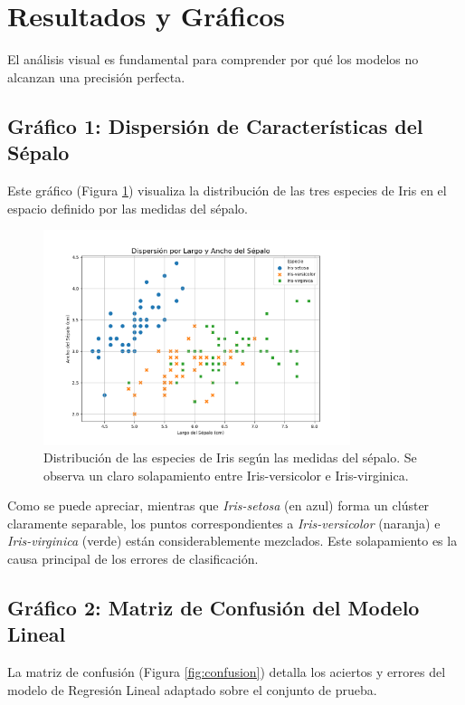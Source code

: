 \documentclass[12pt,a4paper]{article}
\begin{document}
\newpage
\section{Resultados y Gráficos}
El análisis visual es fundamental para comprender por qué los modelos no alcanzan una precisión perfecta.

\subsection{Gráfico 1: Dispersión de Características del Sépalo}
Este gráfico (Figura \ref{fig:dispersion}) visualiza la distribución de las tres especies de Iris en el espacio definido por las medidas del sépalo.

\begin{figure}[H]
    \centering
    \includegraphics[width=0.8\textwidth]{Graficos/1_dispersion_sepalos.png}
    \caption{Distribución de las especies de Iris según las medidas del sépalo. Se observa un claro solapamiento entre Iris-versicolor e Iris-virginica.}
    \label{fig:dispersion}
\end{figure}

Como se puede apreciar, mientras que \textit{Iris-setosa} (en azul) forma un clúster claramente separable, los puntos correspondientes a \textit{Iris-versicolor} (naranja) e \textit{Iris-virginica} (verde) están considerablemente mezclados. Este solapamiento es la causa principal de los errores de clasificación.

\subsection{Gráfico 2: Matriz de Confusión del Modelo Lineal}
La matriz de confusión (Figura \ref{fig:confusion}) detalla los aciertos y errores del modelo de Regresión Lineal adaptado sobre el conjunto de prueba.
\end{document}
